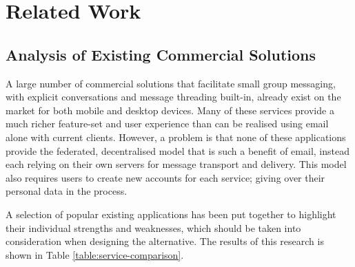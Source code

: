 \chapter{Related Work}


\section{Analysis of Existing Commercial Solutions}

A large number of commercial solutions that facilitate small group messaging, with explicit conversations and message threading built-in, already exist on the market for both mobile and desktop devices. Many of these services provide a much richer feature-set and user experience than can be realised using email alone with current clients. However, a problem is that none of these applications provide the federated, decentralised model that is such a benefit of email, instead each relying on their own servers for message transport and delivery. This model also requires users to create new accounts for each service; giving over their personal data in the process.

A selection of popular existing applications has been put together to highlight their individual strengths and weaknesses, which should be taken into consideration when designing the alternative. The results of this research is shown in Table \ref{table:service-comparison}.

\begin{table}[h]
  \def\arraystretch{1.5}
  \centering
  \caption{Feature comparison of existing commercial messaging applications}
  \label{table:service-comparison}
\end{table}

